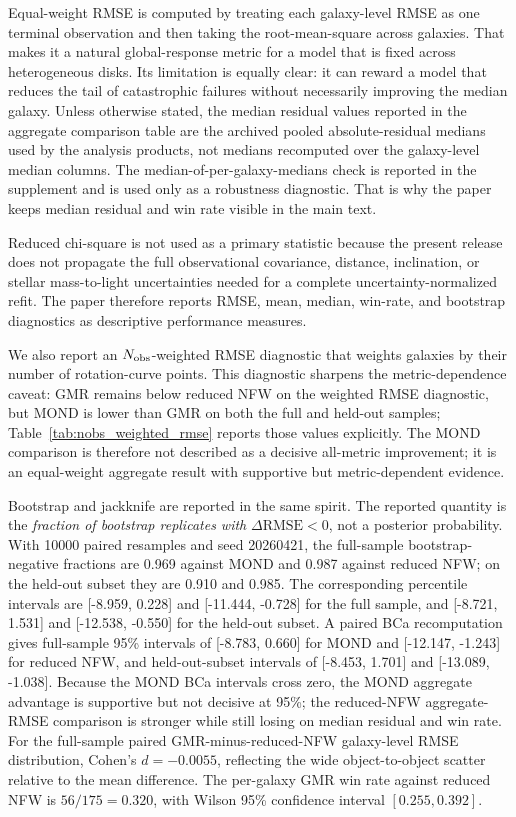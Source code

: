 ﻿\documentclass[twocolumn,linenumbers]{aastex701}
\begin{document}
Equal-weight RMSE is computed by treating each galaxy-level RMSE as one terminal observation and then taking the root-mean-square across galaxies. That makes it a natural global-response metric for a model that is fixed across heterogeneous disks. Its limitation is equally clear: it can reward a model that reduces the tail of catastrophic failures without necessarily improving the median galaxy. Unless otherwise stated, the median residual values reported in the aggregate comparison table are the archived pooled absolute-residual medians used by the analysis products, not medians recomputed over the galaxy-level median columns. The median-of-per-galaxy-medians check is reported in the supplement and is used only as a robustness diagnostic. That is why the paper keeps median residual and win rate visible in the main text.

Reduced chi-square is not used as a primary statistic because the present release does not propagate the full observational covariance, distance, inclination, or stellar mass-to-light uncertainties needed for a complete uncertainty-normalized refit. The paper therefore reports RMSE, mean, median, win-rate, and bootstrap diagnostics as descriptive performance measures.

We also report an $N_{\rm obs}$-weighted RMSE diagnostic that weights galaxies by their number of rotation-curve points. This diagnostic sharpens the metric-dependence caveat: GMR remains below reduced NFW on the weighted RMSE diagnostic, but MOND is lower than GMR on both the full and held-out samples; Table~\ref{tab:nobs_weighted_rmse} reports those values explicitly. The MOND comparison is therefore not described as a decisive all-metric improvement; it is an equal-weight aggregate result with supportive but metric-dependent evidence.

Bootstrap and jackknife are reported in the same spirit. The reported quantity is the \emph{fraction of bootstrap replicates with} $\Delta \mathrm{RMSE} < 0$, not a posterior probability. With 10000 paired resamples and seed 20260421, the full-sample bootstrap-negative fractions are 0.969 against MOND and 0.987 against reduced NFW; on the held-out subset they are 0.910 and 0.985. The corresponding percentile intervals are [-8.959, 0.228] and [-11.444, -0.728] for the full sample, and [-8.721, 1.531] and [-12.538, -0.550] for the held-out subset. A paired BCa recomputation gives full-sample 95\% intervals of [-8.783, 0.660] for MOND and [-12.147, -1.243] for reduced NFW, and held-out-subset intervals of [-8.453, 1.701] and [-13.089, -1.038]. Because the MOND BCa intervals cross zero, the MOND aggregate advantage is supportive but not decisive at 95\%; the reduced-NFW aggregate-RMSE comparison is stronger while still losing on median residual and win rate. For the full-sample paired GMR-minus-reduced-NFW galaxy-level RMSE distribution, Cohen's $d=-0.0055$, reflecting the wide object-to-object scatter relative to the mean difference. The per-galaxy GMR win rate against reduced NFW is $56/175=0.320$, with Wilson 95\% confidence interval $[0.255,0.392]$.
\end{document}
